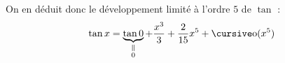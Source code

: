 \begin{exo}
\begin{itemize}
			On en déduit donc le développement limité à l'ordre $5$ de $\tan$ : \[
				\tan x = \underbrace{\tan 0}_{\substack{\,\vrt=\\0}} + \frac{x^3}{3} + \frac{2}{15}x^5 + \po(x^5)
			\] 
	\end{itemize}
\end{exo}


